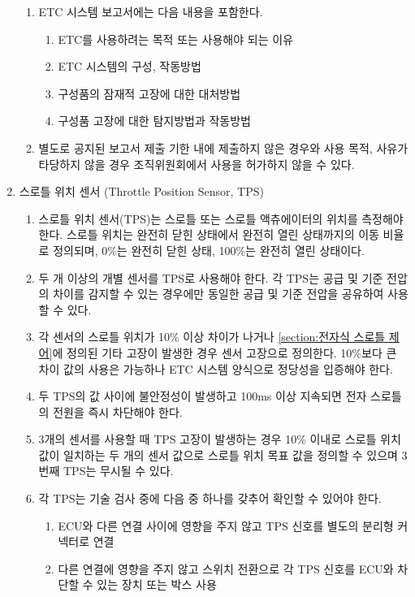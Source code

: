 \documentclass[final,a4paper,10pt]{report}
\begin{document}
\begin{enumerate}
\begin{enumerate}
      \item ETC 시스템 보고서에는 다음 내용을 포함한다.
        \begin{enumerate}
          \item ETC를 사용하려는 목적 또는 사용해야 되는 이유
          \item ETC 시스템의 구성, 작동방법
          \item 구성품의 잠재적 고장에 대한 대처방법
          \item 구성품 고장에 대한 탐지방법과 작동방법
        \end{enumerate}
        
      \item 별도로 공지된 보고서 제출 기한 내에 제출하지 않은 경우와 사용 목적, 사유가 타당하지 않을 경우 조직위원회에서 사용을 허가하지 않을 수 있다.
    \end{enumerate}
    
  \item 스로틀 위치 센서 (Throttle Position Sensor, TPS)
    \begin{enumerate}
      \item 스로틀 위치 센서(TPS)는 스로틀 또는 스로틀 액츄에이터의 위치를 측정해야 한다. 스로틀 위치는 완전히 닫힌 상태에서 완전히 열린 상태까지의 이동 비율로 정의되며, 0\%는 완전히 닫힌 상태, 100\%는 완전히 열린 상태이다.
      \item 두 개 이상의 개별 센서를 TPS로 사용해야 한다. 각 TPS는 공급 및 기준 전압의 차이를 감지할 수 있는 경우에만 동일한 공급 및 기준 전압을 공유하여 사용할 수 있다.
      \item 각 센서의 스로틀 위치가 10\% 이상 차이가 나거나 \cref{section:전자식 스로틀 제어}에 정의된 기타 고장이 발생한 경우 센서 고장으로 정의한다. 10\%보다 큰 차이 값의 사용은 가능하나 ETC 시스템 양식으로 정당성을 입증해야 한다.
      \item 두 TPS의 값 사이에 불안정성이 발생하고 100ms 이상 지속되면 전자 스로틀의 전원을 즉시 차단해야 한다.
      \item 3개의 센서를 사용할 때 TPS 고장이 발생하는 경우 10\% 이내로 스로틀 위치 값이 일치하는 두 개의 센서 값으로 스로틀 위치 목표 값을 정의할 수 있으며 3번째 TPS는 무시될 수 있다.
      
      \item 각 TPS는 기술 검사 중에 다음 중 하나를 갖추어 확인할 수 있어야 한다.
        \begin{enumerate}
          \item ECU와 다른 연결 사이에 영향을 주지 않고 TPS 신호를 별도의 분리형 커넥터로 연결
          \item 다른 연결에 영향을 주지 않고 스위치 전환으로 각 TPS 신호를 ECU와 차단할 수 있는 장치 또는 박스 사용
        \end{enumerate}
        

\end{enumerate}
\end{enumerate}
\end{document}
